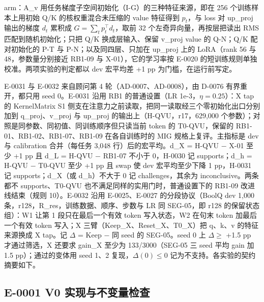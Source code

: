 \documentclass[11pt]{article}
\begin{document}
arm：A\_v 用任务梯度子空间初始化（I-G）的三种特征来源，即在 256 个训练样本上用初始 Q/K 的核权重混合未压缩的 value 特征得到 $p_t$，与 loss 对 up\_proj 输出的梯度 $d_t$ 累积成 $G=\sum_t p_t^\top d_t$，取前 32 个左奇异向量，再按层把读出 RMS 匹配到随机初始化；只把 Q/K 换成层输入、保留 v\_proj value 的 Q-N；Q/K 配对初始化的 P-T 与 P-N；以及同四层、只加在 up\_proj 上的 LoRA（rank 56 与 48，参数量分别接近 RB1-09 与 X-01），它的学习率按 E-0020 的短训练规则单独校准。两项实验的判定都以 dev 宏平均差 +1 pp 为门槛，在运行前写定。

E-0031 与 E-0032 来自顾问第 4 轮（AD-0007、AD-0008），由 D-0076 有界重开，都只用 seed 0。E-0031 沿用 RB1 的普通设置（LR 1e-3，$\eta = 0.25$）：X tap 的 KernelMatrix S1 侧支在注意力之前读取，把同一读取经三个零初始化出口分别加到 q\_proj、v\_proj 与 up\_proj 的输出上（H-QVU，r17，629,000 个参数）；对照是同参数、同初值、同训练顺序但只读当前 token 的 T0-QVU，保留的 RB1-01、RB1-02、RB1-07、RB1-09 在各自训练时的 MIG 规格上复评。主指标是 dev 与 calibration 合并（每任务 3,048 行）后的宏平均。d\_X = H-QVU $-$ X-01 至少 +1 pp 且 d\_L = H-QVU $-$ RB1-07 不小于 0，H-0030 记 supports；d\_h = H-QVU $-$ T0-QVU 至少 +1 pp 且 swap 使 dev 宏平均至少下降 1 pp，H-0031 记 supports；d\_X（或 d\_h）不大于 0 记 challenges，其余为 inconclusive。两条都不 supports、T0-QVU 也不满足同样的实用门时，普通设置下的 RB1-09 改进线结束（规则 10）。E-0032 沿用 E-0025、E-0027 的分段协议（BoolQ dev 1,000 条，r128，R\_res，训练数据、顺序、步数与 LR 同 SEG-05，即 r128 的保留状态组）：W1 让第 1 段只在最后一个有效 token 写入状态，W2 在句末 token 加最后一个有效 token 写入；X 三臂（Keep\_X、Reset\_X、T0\_X）把 q、k、v 的特征来源换成 X tap。记 $\Delta$ = Keep $-$ 同 seed 的 SEG-05。seed 0 上 $\Delta \geq$ +1.5 pp 才通过筛选，X 还要求 gain\_X 至少为 133/3000（SEG-05 三 seed 平均 gain 加 1.5 pp）；通过的变体用 seed 1、2 复现，$\Delta(0) \leq 0$ 记为不支持。各实验的契约摘要如下。

\subsection*{E-0001 V0 实现与不变量检查}
\end{document}
